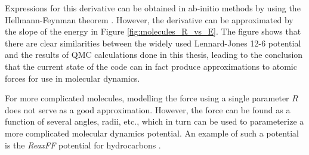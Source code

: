 Expressions for this derivative can be obtained in ab-initio methods by using the Hellmann-Feynman theorem \cite{forcesQMC}. However, the derivative can be approximated by the slope of the energy in Figure \ref{fig:molecules_R_vs_E}. The figure shows that there are clear similarities between the widely used Lennard-Jones 12-6 potential and the results of QMC calculations done in this thesis, leading to the conclusion that the current state of the code can in fact produce approximations to atomic forces for use in molecular dynamics.

For more complicated molecules, modelling the force using a single parameter $R$ does not serve as a good approximation. However, the force can be found as a function of several angles, radii, etc., which in turn can be used to parameterize a more complicated molecular dynamics potential. An example of such a potential is the \textit{ReaxFF} potential for hydrocarbons \cite{ReaxFF}.
